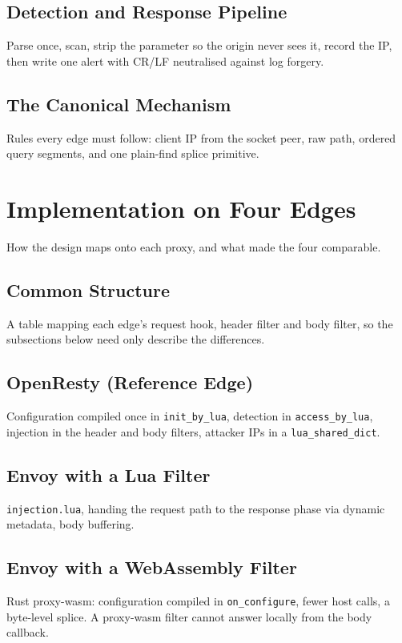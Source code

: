 \documentclass{rptuma}
\begin{document}
\section{Detection and Response Pipeline}
Parse once, scan, strip the parameter so the origin never sees it, record the IP, then write one
alert with CR/LF neutralised against log forgery.

\section{The Canonical Mechanism}
\label{sec:A.canonical}
Rules every edge must follow: client IP from the socket peer, raw path, ordered query segments,
and one plain-find splice primitive.

\chapter{Implementation on Four Edges}
How the design maps onto each proxy, and what made the four comparable.

\section{Common Structure}
A table mapping each edge's request hook, header filter and body filter, so the subsections below
need only describe the differences.

\section{OpenResty (Reference Edge)}
Configuration compiled once in \texttt{init\_by\_lua}, detection in \texttt{access\_by\_lua},
injection in the header and body filters, attacker IPs in a \texttt{lua\_shared\_dict}.

\section{Envoy with a Lua Filter}
\texttt{injection.lua}, handing the request path to the response phase via dynamic metadata, body
buffering.

\section{Envoy with a WebAssembly Filter}
Rust proxy-wasm: configuration compiled in \texttt{on\_configure}, fewer host calls, a byte-level
splice. A proxy-wasm filter cannot answer locally from the body callback.
\end{document}

